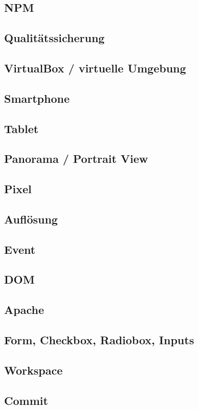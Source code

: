 		\subsection{NPM}
		\subsection{Qualitätssicherung}
		\subsection{VirtualBox / virtuelle Umgebung}
		\subsection{Smartphone}
		\subsection{Tablet}
		\subsection{Panorama / Portrait View}
		\subsection{Pixel}
		\subsection{Auflösung}
		\subsection{Event}
		\subsection{DOM}
		\subsection{Apache}
		\subsection{Form, Checkbox, Radiobox, Inputs}
		\subsection{Workspace}
		\subsection{Commit}
